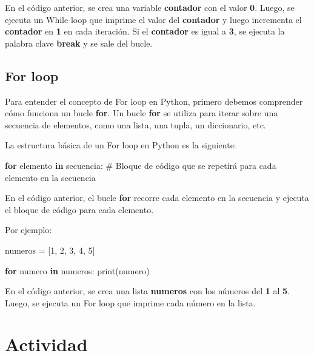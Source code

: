 \documentclass[
  a4paper,
  DIV=11,
  numbers=noendperiod,
  onepage,
  openany]{scrreprt}
\newenvironment{Shaded}{\begin{snugshade}}{\end{snugshade}}
\newcommand{\BuiltInTok}[1]{\textcolor[rgb]{0.00,0.23,0.31}{#1}}
\newcommand{\CommentTok}[1]{\textcolor[rgb]{0.37,0.37,0.37}{#1}}
\newcommand{\ControlFlowTok}[1]{\textcolor[rgb]{0.00,0.23,0.31}{\textbf{#1}}}
\newcommand{\DecValTok}[1]{\textcolor[rgb]{0.68,0.00,0.00}{#1}}
\newcommand{\KeywordTok}[1]{\textcolor[rgb]{0.00,0.23,0.31}{\textbf{#1}}}
\newcommand{\NormalTok}[1]{\textcolor[rgb]{0.00,0.23,0.31}{#1}}
\newcommand{\OperatorTok}[1]{\textcolor[rgb]{0.37,0.37,0.37}{#1}}
\begin{document}
En el código anterior, se crea una variable \textbf{contador} con el
valor \textbf{0}. Luego, se ejecuta un While loop que imprime el valor
del \textbf{contador} y luego incrementa el \textbf{contador} en
\textbf{1} en cada iteración. Si el \textbf{contador} es igual a
\textbf{3}, se ejecuta la palabra clave \textbf{break} y se sale del
bucle.

\section{For loop}\label{for-loop}

Para entender el concepto de For loop en Python, primero debemos
comprender cómo funciona un bucle \textbf{for}. Un bucle \textbf{for} se
utiliza para iterar sobre una secuencia de elementos, como una lista,
una tupla, un diccionario, etc.

La estructura básica de un For loop en Python es la siguiente:

\begin{Shaded}
\begin{Highlighting}[]
\ControlFlowTok{for}\NormalTok{ elemento }\KeywordTok{in}\NormalTok{ secuencia:}
    \CommentTok{\# Bloque de código que se repetirá para cada elemento en la secuencia}
\end{Highlighting}
\end{Shaded}

En el código anterior, el bucle \textbf{for} recorre cada elemento en la
secuencia y ejecuta el bloque de código para cada elemento.

Por ejemplo:

\begin{Shaded}
\begin{Highlighting}[]
\NormalTok{numeros }\OperatorTok{=}\NormalTok{ [}\DecValTok{1}\NormalTok{, }\DecValTok{2}\NormalTok{, }\DecValTok{3}\NormalTok{, }\DecValTok{4}\NormalTok{, }\DecValTok{5}\NormalTok{]}

\ControlFlowTok{for}\NormalTok{ numero }\KeywordTok{in}\NormalTok{ numeros:}
    \BuiltInTok{print}\NormalTok{(numero)}
\end{Highlighting}
\end{Shaded}

En el código anterior, se crea una lista \textbf{numeros} con los
números del \textbf{1} al \textbf{5}. Luego, se ejecuta un For loop que
imprime cada número en la lista.

\chapter{Actividad}\label{actividad-2}
\end{document}
